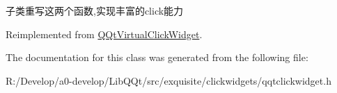子类重写这两个函数,实现丰富的click能力 

Reimplemented from \mbox{\hyperlink{class_q_qt_virtual_click_widget_a2e9874c5ec5aba763426dcacb012d7a7}{Q\+Qt\+Virtual\+Click\+Widget}}.



The documentation for this class was generated from the following file\+:\begin{DoxyCompactItemize}
\item 
R\+:/\+Develop/a0-\/develop/\+Lib\+Q\+Qt/src/exquisite/clickwidgets/qqtclickwidget.\+h\end{DoxyCompactItemize}
